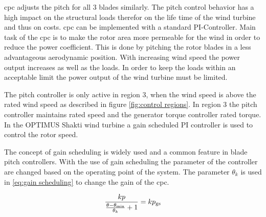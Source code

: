 \gls{cpc} adjusts the pitch for all 3 blades similarly.
The pitch control behavior has a high impact on the structural loads therefor on the life time of the wind turbine and thus on costs.
\gls{cpc} can be implemented with a standard PI-Controller.
Main task of the \gls{cpc} is to make the rotor area more permeable for the wind in order to reduce the power coefficient.
This is done by pitching the rotor blades in a less advantageous aerodynamic position.
With increasing wind speed the power output increases as well as the loads.
In order to keep the loads within an acceptable limit the power output of the wind turbine must be limited.

The pitch controller is only active in region 3, when the wind speed is above the rated wind speed as described in figure \ref{fig:control regions}.
In region 3 the pitch controller maintains rated speed and the generator torque controller rated torque. In the OPTIMUS Shakti wind turbine a gain scheduled PI controller is used to control the rotor speed.

The concept of gain scheduling is widely used and a common feature in blade pitch controllers.
With the use of gain scheduling the parameter of the controller are changed based on the operating point of the system. The parameter $\theta_k$ is used in \ref{eq:gain scheduling} to change the gain of the \gls{cpc}.

\begin{equation}
	\frac{kp}{\frac{\theta - \theta_\textnormal{min}}{\theta_k} + 1} = kp_\textnormal{gs}
	\label{eq:gain scheduling}
\end{equation}



